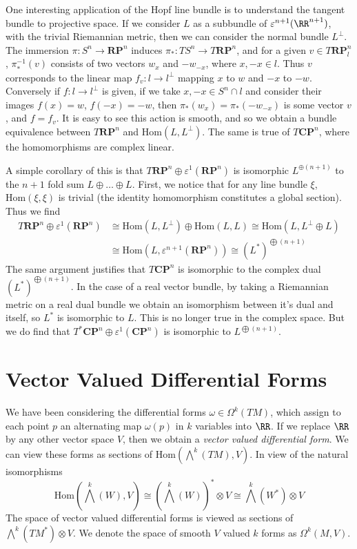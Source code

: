 One interesting application of the Hopf line bundle is to understand the tangent bundle to projective space. If we consider $L$ as a subbundle of $\varepsilon^{n+1}(\RR^{n+1})$, with the trivial Riemannian metric, then we can consider the normal bundle $L^\perp$. The immersion $\pi: S^n \to \mathbf{RP}^n$ induces $\pi_*: TS^n \to T\mathbf{RP}^n$, and for a given $v \in T\mathbf{RP}^n_l$, $\pi_*^{-1}(v)$ consists of two vectors $w_x$ and $-w_{-x}$, where $x,-x \in l$. Thus $v$ corresponds to the linear map $f_v: l \to l^\perp$ mapping $x$ to $w$ and $-x$ to $-w$. Conversely if $f: l \to l^\perp$ is given, if we take $x,-x \in S^n \cap l$ and consider their images $f(x) = w$, $f(-x) = -w$, then $\pi_*(w_x) = \pi_*(-w_{-x})$ is some vector $v$, and $f = f_v$. It is easy to see this action is smooth, and so we obtain a bundle equivalence between $T\mathbf{RP}^n$ and $\text{Hom}(L,L^\perp)$. The same is true of $T\mathbf{CP}^n$, where the homomorphisms are complex linear.

A simple corollary of this is that $T\mathbf{RP}^n \oplus \varepsilon^1(\mathbf{RP}^n)$ is isomorphic $L^{\oplus (n+1)}$ to the $n+1$ fold sum $L \oplus \dots \oplus L$. First, we notice that for any line bundle $\xi$, $\text{Hom}(\xi,\xi)$ is trivial (the identity homomorphism constitutes a global section). Thus we find
%
\begin{align*}
    T\mathbf{RP}^n \oplus \varepsilon^1(\mathbf{RP}^n) &\cong \text{Hom}(L,L^\perp) \oplus \text{Hom}(L,L) \cong \text{Hom}(L,L^\perp \oplus L)\\
    &\cong \text{Hom}(L,\varepsilon^{n+1}(\mathbf{RP}^n)) \cong (L^*)^{\bigoplus (n+1)}
\end{align*}
%
The same argument justifies that $T\mathbf{CP}^n$ is isomorphic to the complex dual $(L^*)^{\bigoplus (n+1)}$. In the case of a real vector bundle, by taking a Riemannian metric on a real dual bundle we obtain an isomorphism between it's dual and itself, so $L^*$ is isomorphic to $L$. This is no longer true in the complex space. But we do find that $T^* \mathbf{CP}^n \oplus \varepsilon^1(\mathbf{CP}^n)$ is isomorphic to $L^{\bigoplus (n+1)}$.

\section{Vector Valued Differential Forms}

We have been considering the differential forms $\omega \in \Omega^k(TM)$, which assign to each point $p$ an alternating map $\omega(p)$ in $k$ variables into $\RR$. If we replace $\RR$ by any other vector space $V$, then we obtain a \emph{vector valued differential form}. We can view these forms as sections of $\text{Hom} \left( \bigwedge^k(TM) ,V \right)$. In view of the natural isomorphisms
%
\[ \text{Hom} \left( \bigwedge^k(W) ,V \right) \cong (\bigwedge^k(W))^* \otimes V \cong \bigwedge^k(W^*) \otimes V \]
%
The space of vector valued differential forms is viewed as sections of $\bigwedge^k(TM^*) \otimes V$. We denote the space of smooth $V$ valued $k$ forms as $\Omega^k(M,V)$.

